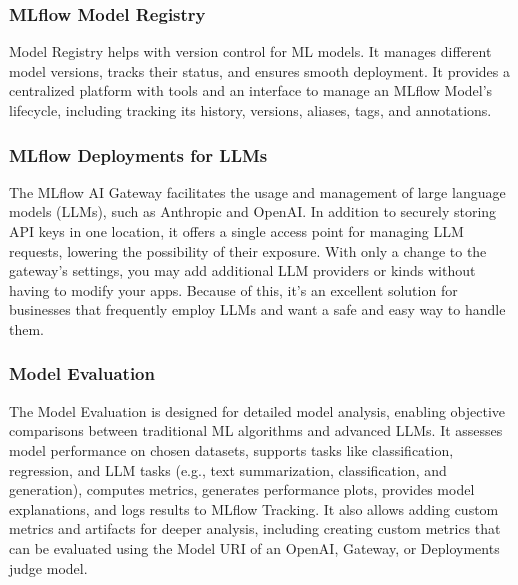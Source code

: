         \subsubsection{MLflow Model Registry}
        Model Registry helps with version control for ML models. It manages different model versions, tracks their status, and ensures smooth deployment. It provides a centralized platform with tools and an interface to manage an MLflow Model's lifecycle, including tracking its history, versions, aliases, tags, and annotations.
        \subsubsection{MLflow Deployments for LLMs}
        The MLflow AI Gateway facilitates the usage and management of large language models (LLMs), such as Anthropic and OpenAI.  In addition to securely storing API keys in one location, it offers a single access point for managing LLM requests, lowering the possibility of their exposure.  With only a change to the gateway's settings, you may add additional LLM providers or kinds without having to modify your apps.  Because of this, it's an excellent solution for businesses that frequently employ LLMs and want a safe and easy way to handle them.
        \subsubsection{Model Evaluation}
        The Model Evaluation is designed for detailed model analysis, enabling objective comparisons between traditional ML algorithms and advanced LLMs. It assesses model performance on chosen datasets, supports tasks like classification, regression, and LLM tasks (e.g., text summarization, classification, and generation), computes metrics, generates performance plots, provides model explanations, and logs results to MLflow Tracking. It also allows adding custom metrics and artifacts for deeper analysis, including creating custom metrics that can be evaluated using the Model URI of an OpenAI, Gateway, or Deployments judge model.
